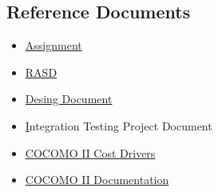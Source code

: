 \subsection{Reference Documents}
\begin{itemize}
	\item \href{https://github.com/StefanoBoriero/PowerEnjoy_Boriero_Brunitti/blob/master/Assignments%20AA%202016-2017.pdf}{Assignment}
\item \href{https://github.com/StefanoBoriero/PowerEnjoy_Boriero_Brunitti/blob/master/releases/RASD_v1.md}{RASD}
\item \href{https://github.com/StefanoBoriero/PowerEnjoy_Boriero_Brunitti/blob/master/releases/DD_v1.1.pdf}{Desing Document}
	\item \href{https://github.com/StefanoBoriero/PowerEnjoy_Boriero_Brunitti/blob/master/releases/ITPD_v1.pdf} Integration Testing Project Document
	\item \href{http://sunset.usc.edu/research/COCOMOII/expert_cocomo/drivers.html}{COCOMO II Cost Drivers}
	\item \href{http://csse.usc.edu/csse/research/COCOMOII/cocomo2000.0/CII_modelman2000.0.pdf}{COCOMO II Documentation}
\end{itemize} 